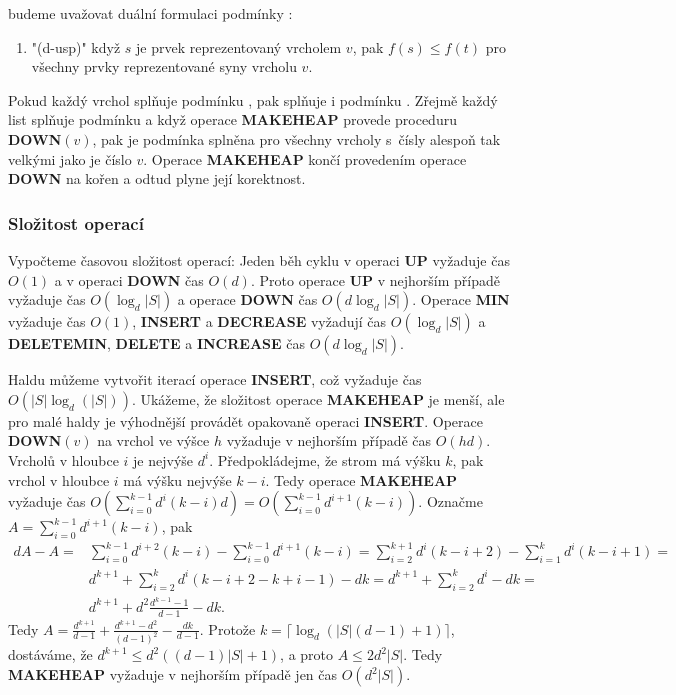 \documentclass[a4paper,12pt]{article}
\begin{document}
budeme uvažovat duální formulaci podmínky :  
\begin{enumerate}
\item"{(d-usp)}"
když $s$ je prvek reprezentovaný vrcholem $v$, pak 
$f(s)\le f(t)$ pro všechny prvky reprezentované syny 
vrcholu $v$. 
\end{enumerate}
Pokud každý vrchol splňuje podmínku , pak 
splňuje i pod\-mínku . Zřejmě každý list splňuje 
podmínku  a když ope\-race {\bf MAKEHEAP }
provede proceduru {\bf DOWN$(v)$}, pak je podmínka 
 splněna pro všechny vrcholy s~čísly alespoň tak velkými jako je číslo $v$. 
Operace {\bf MAKEHEAP} končí provedením operace {\bf DOWN} na 
kořen a odtud plyne její korektnost.

\subsubsection{Složitost operací}

Vypočteme časovou složitost operací:  Jeden běh cyklu 
v operaci {\bf UP} vyžaduje čas $O(1)$ a v operaci {\bf DOWN }čas $
O(d)$.  
Proto operace {\bf UP} v nejhorším případě vyžaduje čas $
O(\log_d|S|)$ 
a operace {\bf DOWN }čas $O(d\log_d|S|)$.  
Operace {\bf MIN} vyžaduje čas $O(1)$,  {\bf INSERT} a {\bf DECREASE }
vyžadu\-jí čas $O(\log_d|S|)$ a  {\bf DELETEMIN}, {\bf DELETE} a 
{\bf INCREASE }čas $O(d\log_d|S|)$.

Haldu můžeme 
vytvořit iterací operace {\bf INSERT}, což 
vyžaduje čas $O(|S|\log_d(|S|))$.  Ukáže\-me, že složitost operace 
{\bf MAKEHEAP} je menší, ale pro malé haldy je výhodnější 
provádět opakovaně operaci {\bf INSERT}.  Operace {\bf DOWN$
(v)$} na vrchol 
ve výšce $h$ vyžaduje v nej\-horším případě čas $
O(hd)$.  
Vrcholů v hloubce $i$ je nejvýše $d^i$.  
Před\-pok\-lá\-dejme, že strom má výšku $k$, pak vrchol v 
hloubce $i$ má výšku nejvýše $k-i$.  Tedy operace {\bf MAKEHEAP }
vyžaduje čas $O(\sum_{i=0}^{k-1}d^i(k-i)d)=O(\sum_{i=0}^{k-
1}d^{i+1}(k-i))$.  Oz\-nač\-me 
$A=\sum_{i=0}^{k-1}d^{i+1}(k-i)$, pak 
\begin{align*} dA-A=&\sum_{i=0}^{k-1}d^{i+2}(k-i)-\sum_{i=0}^{k-1}d^{i+
1}(k-i)=\sum_{i=2}^{k+1}d^i(k-i+2)-\sum_{i=1}^kd^i(k-i+1)=\\
&d^{k+1}+\sum_{i=2}^kd^i(k-i+2-k+i-1)-dk=d^{k+1}+\sum_{i=2}^kd^i-
dk=\\
&d^{k+1}+d^2\frac {d^{k-1}-1}{d-1}-dk.\end{align*}
Tedy $A=\frac {d^{k+1}}{d-1}+\frac {d^{k+1}-d^2}{(d-1)^2}-\frac {
dk}{d-1}$. Protože 
$k=\lceil\log_d(|S|(d-1)+1)\rceil$, 
dostáváme, že $d^{k+1}\le d^2((d-1)|S|+1)$, a proto $A\le 
2d^2|S|$. Tedy 
{\bf MAKEHEAP} vyžaduje v nejhorším případě jen čas 
$O(d^2|S|)$. 
\end{document}
